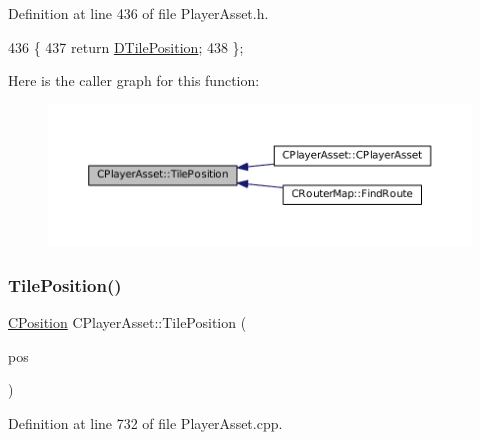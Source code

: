Definition at line 436 of file Player\+Asset.\+h.


\begin{DoxyCode}
436                                       \{
437             \textcolor{keywordflow}{return} \hyperlink{classCPlayerAsset_a5b59a9d3b7db8c7fa194b80dafb96186}{DTilePosition};  
438         \};
\end{DoxyCode}
Here is the caller graph for this function\+:\nopagebreak
\begin{figure}[H]
\begin{center}
\leavevmode
\includegraphics[width=350pt]{classCPlayerAsset_a23354232e5585574bc8e12c1fdb37ad9_icgraph}
\end{center}
\end{figure}
\hypertarget{classCPlayerAsset_a6d84105b6db136a6846fcaf80dba3747}{}\label{classCPlayerAsset_a6d84105b6db136a6846fcaf80dba3747} 
\subsubsection{\texorpdfstring{Tile\+Position()}{TilePosition()}\hspace{0.1cm}{\footnotesize\ttfamily [2/2]}}
{\footnotesize\ttfamily \hyperlink{classCPosition}{C\+Position} C\+Player\+Asset\+::\+Tile\+Position (\begin{DoxyParamCaption}\item[{const \hyperlink{classCPosition}{C\+Position} \&}]{pos }\end{DoxyParamCaption})}



Definition at line 732 of file Player\+Asset.\+cpp.


